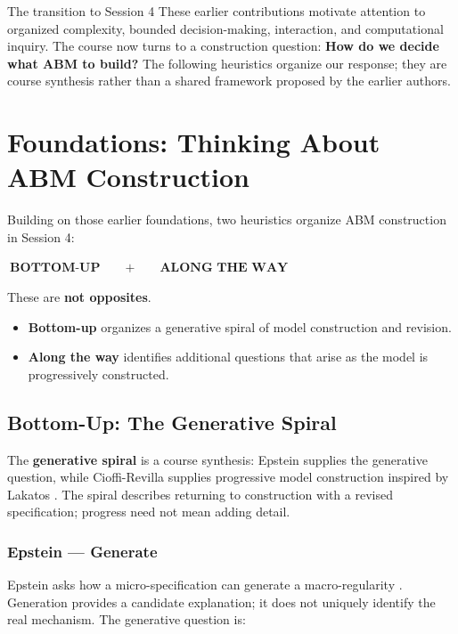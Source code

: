 \documentclass[11pt,a4paper]{article}
\newenvironment{fitdisplay}{\par\medskip\noindent\begin{lrbox}{\displaybox}$\displaystyle}{%
$\end{lrbox}\makebox[\linewidth][c]{\ifdim\wd\displaybox>\linewidth\resizebox{\linewidth}{!}{\usebox{\displaybox}}\else\usebox{\displaybox}\fi}\par\medskip}
\begin{document}
\begin{principle}{The transition to Session 4}
These earlier contributions motivate attention to organized complexity, bounded decision-making, interaction, and computational inquiry. The course now turns to a construction question: \textbf{How do we decide what ABM to build?} The following heuristics organize our response; they are course synthesis rather than a shared framework proposed by the earlier authors.
\end{principle}

\clearpage
\section{Foundations: Thinking About ABM Construction}

Building on those earlier foundations, two heuristics organize ABM construction in Session 4:

\begin{fitdisplay}
\boxed{\textbf{BOTTOM-UP}}
\qquad+\qquad
\boxed{\textbf{ALONG THE WAY}}
\end{fitdisplay}

These are \textbf{not opposites}.

\begin{itemize}
\item \textbf{Bottom-up} organizes a generative spiral of model construction and revision.
\item \textbf{Along the way} identifies additional questions that arise as the model is progressively constructed.
\end{itemize}

\subsection{Bottom-Up: The Generative Spiral}

The \textbf{generative spiral} is a course synthesis: Epstein supplies the generative question, while Cioffi-Revilla supplies progressive model construction inspired by Lakatos \cite{epstein,cioffi}. The spiral describes returning to construction with a revised specification; progress need not mean adding detail.

\subsubsection{Epstein --- Generate}

Epstein asks how a micro-specification can generate a macro-regularity \cite[pp.~41--43]{epstein}. Generation provides a candidate explanation; it does not uniquely identify the real mechanism. The generative question is:
\end{document}
